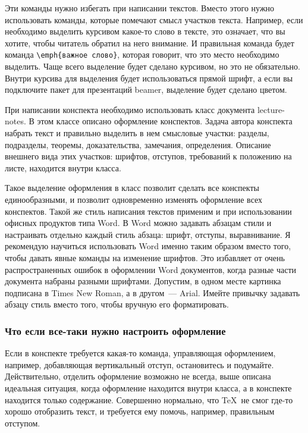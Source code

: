 \documentclass{article}
\begin{document}
    Эти команды нужно избегать при написании текстов. Вместо этого нужно использовать команды,
    которые помечают смысл участков текста. Например, если необходимо выделить курсивом
    какое-то слово в тексте, это означает, что вы хотите, чтобы читатель обратил на него внимание.
    И правильная команда будет команда \verb|\emph{важное слово}|, которая говорит, что
    это место необходимо выделить. Чаще всего выделение будет сделано курсивом, но это не
    обязательно. Внутри курсива для выделения будет использоваться прямой шрифт, а если вы
    подключите пакет для презентаций beamer, выделение будет сделано цветом.

    При написании конспекта необходимо использовать класс документа lecture-notes. В этом
    классе описано оформление конспектов. Задача автора конспекта набрать текст и правильно
    выделить в нем смысловые участки: разделы, подразделы, теоремы, доказательства, замечания,
    определения. Описание внешнего вида этих участков: шрифтов, отступов, требований к положению
    на листе, находится внутри класса.

    Такое выделение оформления в класс позволит сделать все конспекты единообразными,
    и позволит одновременно изменять оформление всех конспектов. Такой же стиль написания текстов
    применим и при использовании офисных продуктов типа Word. В Word можно задавать абзацам
    стили и настраивать отдельно каждый стиль абзаца: шрифт, отступы, выравнивание. Я рекомендую
    научиться использовать Word именно таким образом вместо того, чтобы давать явные команды
    на изменение шрифтов. Это избавляет от очень распространенных ошибок в оформлении Word
    документов, когда разные части документа набраны разными шрифтами. Допустим,
    в одном месте картинка подписана в Times New Roman, а в другом~--- Arial.
    Имейте привычку задавать абзацу стиль вместо того, чтобы вручную его форматировать.

    \subsubsection{Что если все-таки нужно настроить оформление}
    Если в конспекте требуется какая-то команда, управляющая оформлением, например,
    добавляющая вертикальный отступ, остановитесь и подумайте. Действительно, отделить
    оформление возможно не всегда, выше описана идеальная ситуация, когда оформление
    находится внутри класса, а в конспекте находится только содержание. Совершенно нормально,
    что \TeX\ не смог где-то хорошо отобразить текст, и требуется ему помочь, например,
    правильным отступом.
\end{document}
